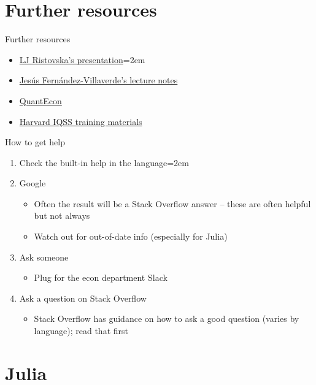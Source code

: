 \documentclass[handout]{beamer}
\begin{document}
\section{Further resources}
\begin{frame}{Further resources}
\begin{itemize}
    \item \href{https://scholar.harvard.edu/ristovska/resources}{LJ Ristovska's presentation}\itemsep=2em
    \item \href{https://www.sas.upenn.edu/~jesusfv/teaching.html}{Jesús Fernández-Villaverde's lecture notes}
    \item \href{https://quantecon.org/}{QuantEcon}
    \item \href{https://www.iq.harvard.edu/data-science-services/workshop-materials}{Harvard IQSS training materials}
\end{itemize}
\end{frame}

\begin{frame}{How to get help}

\begin{enumerate}
    \item Check the built-in help in the language\itemsep=2em
    \item Google
    \begin{itemize}
        \item Often the result will be a Stack Overflow answer -- these are often helpful but not always
        \item Watch out for out-of-date info (especially for Julia)
    \end{itemize}
    \item Ask someone
    \begin{itemize}
        \item Plug for the econ department Slack
    \end{itemize}
    \item Ask a question on Stack Overflow
    \begin{itemize}
        \item Stack Overflow has guidance on how to ask a good question (varies by language); read that first
    \end{itemize}
\end{enumerate}
\end{frame}

\section{Julia}
\end{document}
